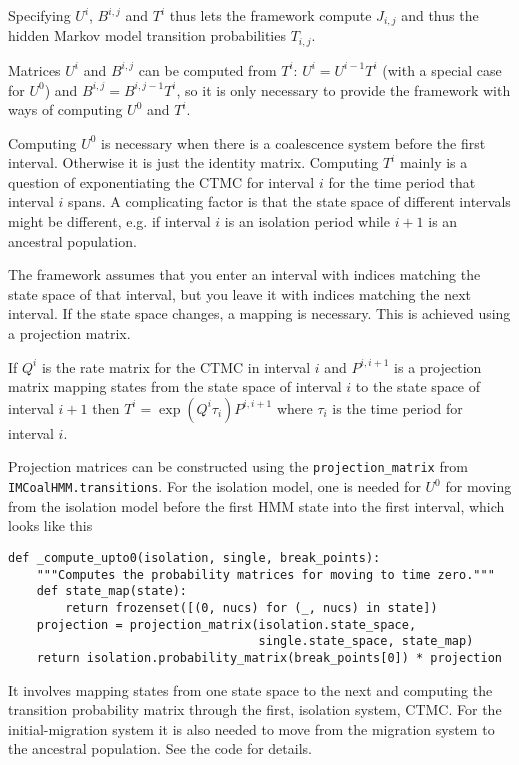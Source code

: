 \documentclass[11pt]{article}
\begin{document}
Specifying $U^i$, $B^{i,j}$ and $T^i$ thus lets the framework compute $J_{i,j}$ and thus the hidden Markov model transition probabilities $T_{i,j}$.

Matrices $U^i$ and $B^{i,j}$ can be computed from $T^i$: $U^i = U^{i-1}T^i$ (with a special case for $U^0$) and $B^{i,j}=B^{i,j-1}T^i$, so it is only necessary to provide the framework with ways of computing $U^0$ and $T^i$.

Computing $U^0$ is necessary when there is a coalescence system before the first interval. Otherwise it is just the identity matrix. Computing $T^i$ mainly is a question of exponentiating the CTMC for interval $i$ for the time period that interval $i$ spans. A complicating factor is that the state space of different intervals might be different, e.g. if interval $i$ is an isolation period while $i+1$ is an ancestral population.

The framework assumes that you enter an interval with indices matching the state space of that interval, but you leave it with indices matching the next interval. If the state space changes, a mapping is necessary. This is achieved using a projection matrix.

If $Q^i$ is the rate matrix for the CTMC in interval $i$ and $P^{i,i+1}$ is a projection matrix mapping states from the state space of interval $i$ to the state space of interval $i+1$ then $T^i = \exp(Q^i\tau_i)P^{i,i+1}$ where $\tau_i$ is the time period for interval $i$.

Projection matrices can be constructed using the \texttt{projection\_matrix} from \texttt{IMCoalHMM.transitions}. For the isolation model, one is needed for $U^0$ for moving from the isolation model before the first HMM state into the first interval, which looks like this

\begin{verbatim}
def _compute_upto0(isolation, single, break_points):
    """Computes the probability matrices for moving to time zero."""
    def state_map(state):
        return frozenset([(0, nucs) for (_, nucs) in state])
    projection = projection_matrix(isolation.state_space, 
                                   single.state_space, state_map)
    return isolation.probability_matrix(break_points[0]) * projection
\end{verbatim}

It involves mapping states from one state space to the next and computing the transition probability matrix through the first, isolation system, CTMC. For the initial-migration system it is also needed to move from the migration system to the ancestral population. See the code for details.
\end{document}
